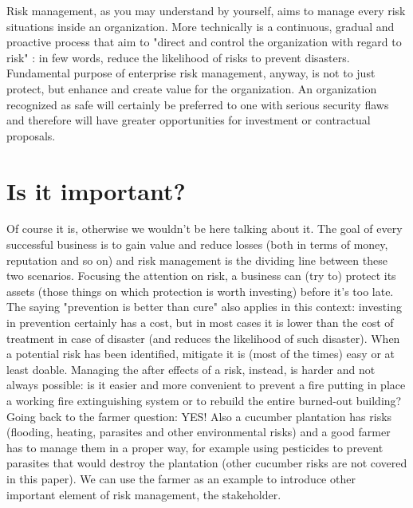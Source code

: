 Risk management, as you may understand by yourself, aims to manage every risk situations inside an organization. More technically is a continuous, gradual and proactive process that aim to "direct and control the organization with regard to risk" \cite{ISO2018}: in few words, reduce the likelihood of risks to prevent disasters. Fundamental purpose of enterprise risk management, anyway, is not to just protect, but enhance and create value for the organization. An organization recognized as safe will certainly be preferred to one with serious security flaws and therefore will have greater opportunities for investment or contractual proposals.
\section{Is it important?}
Of course it is, otherwise we wouldn't be here talking about it. The goal of every successful business is to gain value and reduce losses (both in terms of money, reputation and so on) and risk management is the dividing line between these two scenarios. Focusing the attention on risk, a business can (try to) protect its assets (those things on which protection is worth investing) before it's too late. The saying "prevention is better than cure" also applies in this context: investing in prevention certainly has a cost, but in most cases it is lower than the cost of treatment in case of disaster (and reduces the likelihood of such disaster). When a potential risk has been identified, mitigate it is (most of the times) easy or at least doable. Managing the after effects of a risk, instead, is harder and not always possible: is it easier and more convenient to prevent a fire putting in place a working fire extinguishing system or to rebuild the entire burned-out building?\newline
Going back to the farmer question: YES! Also a cucumber plantation has risks (flooding, heating, parasites and other environmental risks) and a good farmer has to manage them in a proper way, for example using pesticides to prevent parasites that would destroy the plantation (other cucumber risks are not covered in this paper).
We can use the farmer as an example to introduce other important element of risk management, the stakeholder.
